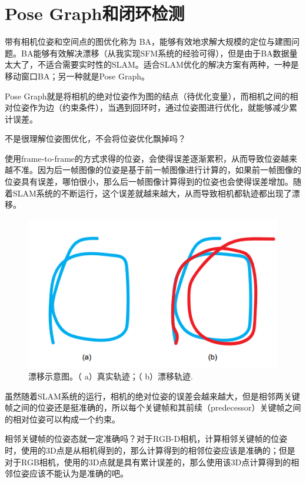 \section{Pose Graph和闭环检测}
带有相机位姿和空间点的图优化称为 BA，能够有效地求解大规模的定位与建图问题。BA能够有效解决漂移（从我实现SFM系统的经验可得），但是由于BA数据量太大了，不适合需要实时性的SLAM。适合SLAM优化的解决方案有两种，一种是移动窗口BA；另一种就是Pose Graph。
	
Pose Graph就是将相机的绝对位姿作为图的结点（待优化变量），而相机之间的相对位姿作为边（约束条件），当遇到回环时，通过位姿图进行优化，就能够减少累计误差。

\begin{note}
	不是很理解位姿图优化，不会将位姿优化飘掉吗？
\end{note}
	
使用frame-to-frame的方式求得的位姿，会使得误差逐渐累积，从而导致位姿越来越不准。因为后一帧图像的位姿是基于前一帧图像进行计算的，如果前一帧图像的位姿具有误差，哪怕很小，那么后一帧图像计算得到的位姿也会使得误差增加。随着SLAM系统的不断运行，这个误差就越来越大，从而导致相机都轨迹都出现了漂移。

\begin{figure}[h]%
	\centering  %
	\includegraphics[width=0.7\linewidth]{image/Trajectory_drift}  %
	\caption{漂移示意图。（ a）真实轨迹；（ b）漂移轨迹.}  %
	\label{fig:Trajectory_drift}   %
\end{figure}
	
虽然随着SLAM系统的运行，相机的绝对位姿的误差会越来越大，但是相邻两关键帧之间的位姿还是挺准确的，所以每个关键帧和其前续（predecessor）关键帧之间的相对位姿可以构成一个约束。

\begin{note}
	相邻关键帧的位姿态就一定准确吗？对于RGB-D相机，计算相邻关键帧的位姿时，使用的3D点是从相机得到的，那么计算得到的相邻位姿应该是准确的；但是对于RGB相机，使用的3D点就是具有累计误差的，那么使用该3D点计算得到的相邻位姿应该不能认为是准确的吧。
\end{note}
